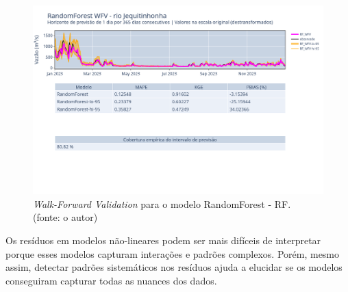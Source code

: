 \begin{figure}[!h]
	\centering
	\includegraphics[scale=0.33]{Figuras/jequiti/wfv/RF/RF_WFV_LOG.png}
	\caption{\textit{Walk-Forward Validation} para o modelo RandomForest - RF.\\(fonte: o autor)}
	\label{fig:jequiti_RF_WFV_LOG}
\end{figure}
\clearpage

Os resíduos em modelos não-lineares podem ser mais difíceis de interpretar porque esses modelos capturam interações e padrões complexos. Porém, mesmo assim, detectar padrões sistemáticos nos resíduos ajuda a elucidar se os modelos conseguiram capturar todas as nuances dos dados.

%
%

